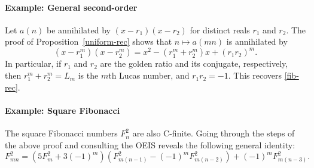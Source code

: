 \documentclass[12pt]{article}
\begin{document}
\paragraph{Example: General second-order} Let $a(n)$ be annihilated by $(x -
r_1) (x - r_2)$ for distinct reals $r_1$ and $r_2$. The proof of
Proposition~\ref{uniform-rec} shows that $n \mapsto a(mn)$ is annihilated by
\begin{equation*}
    (x - r_1^m)(x - r_2^m) = x^2 - (r_1^m + r_2^m) x + (r_1 r_2)^m.
\end{equation*}
In particular, if $r_1$ and $r_2$ are the golden ratio and its conjugate,
respectively, then $r_1^m + r_2^m = L_m$ is the $m$th Lucas number, and $r_1
r_2 = -1$. This recovers \eqref{fib-rec}.

\paragraph{Example: Square Fibonacci} The square Fibonacci numbers $F_n^2$ are
also C-finite. Going through the steps of the above proof and consulting the
OEIS reveals the following general identity:
\begin{equation}
    \label{square-rec}
    F_{mn}^2 = (5 F_m^2 + 3 (-1)^m) (F_{m(n - 1)}^2 - (-1)^m F_{m(n - 2)}^2) + (-1)^m F_{m(n - 3)}^2.
\end{equation}
\end{document}
